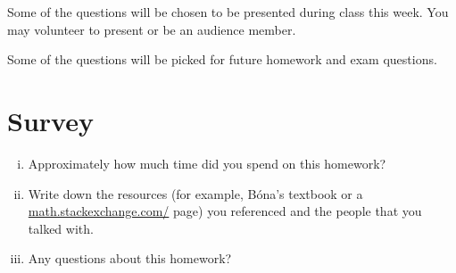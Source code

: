 \documentclass[10pt]{amsart}
\begin{document}
Some of the questions will be chosen to be presented during class this week. You may volunteer to present or be an audience member. 

Some of the questions will be picked for future homework and exam questions. 



\section{Survey}
\begin{enumerate}[i.] 
\item Approximately how much time did you spend on this homework?
\item Write down the resources (for example, B\'ona's textbook or a  \href{https://math.stackexchange.com/}{math.stackexchange.com/} page) you referenced and the people that you talked with.	
\item Any questions about this homework?
\end{enumerate}
\end{document}
